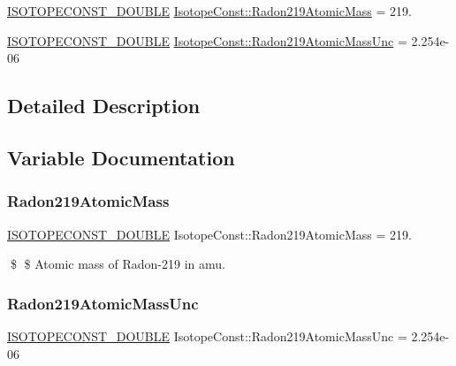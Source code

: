 \begin{DoxyCompactItemize}
\item 
\mbox{\hyperlink{group___isotope_const-_macros_ga8f45a7272ce02c0b4c65c44636ed719a}{I\+S\+O\+T\+O\+P\+E\+C\+O\+N\+S\+T\+\_\+\+D\+O\+U\+B\+LE}} \mbox{\hyperlink{group___isotope_const-_radon-_rn219_ga0eb163fd51fb54f17ac3c1f463ca6799}{Isotope\+Const\+::\+Radon219\+Atomic\+Mass}} = 219.
\item 
\mbox{\hyperlink{group___isotope_const-_macros_ga8f45a7272ce02c0b4c65c44636ed719a}{I\+S\+O\+T\+O\+P\+E\+C\+O\+N\+S\+T\+\_\+\+D\+O\+U\+B\+LE}} \mbox{\hyperlink{group___isotope_const-_radon-_rn219_ga1ad08b3f11dec33e9f6f51169d6fb3b1}{Isotope\+Const\+::\+Radon219\+Atomic\+Mass\+Unc}} = 2.\+254e-\/06
\end{DoxyCompactItemize}


\subsection{Detailed Description}


\subsection{Variable Documentation}
\mbox{\label{group___isotope_const-_radon-_rn219_ga0eb163fd51fb54f17ac3c1f463ca6799}} 
\subsubsection{\texorpdfstring{Radon219\+Atomic\+Mass}{Radon219AtomicMass}}
{\footnotesize\ttfamily \mbox{\hyperlink{group___isotope_const-_macros_ga8f45a7272ce02c0b4c65c44636ed719a}{I\+S\+O\+T\+O\+P\+E\+C\+O\+N\+S\+T\+\_\+\+D\+O\+U\+B\+LE}} Isotope\+Const\+::\+Radon219\+Atomic\+Mass = 219.}

\$ \$ Atomic mass of Radon-\/219 in amu. \mbox{\label{group___isotope_const-_radon-_rn219_ga1ad08b3f11dec33e9f6f51169d6fb3b1}} 
\subsubsection{\texorpdfstring{Radon219\+Atomic\+Mass\+Unc}{Radon219AtomicMassUnc}}
{\footnotesize\ttfamily \mbox{\hyperlink{group___isotope_const-_macros_ga8f45a7272ce02c0b4c65c44636ed719a}{I\+S\+O\+T\+O\+P\+E\+C\+O\+N\+S\+T\+\_\+\+D\+O\+U\+B\+LE}} Isotope\+Const\+::\+Radon219\+Atomic\+Mass\+Unc = 2.\+254e-\/06}

